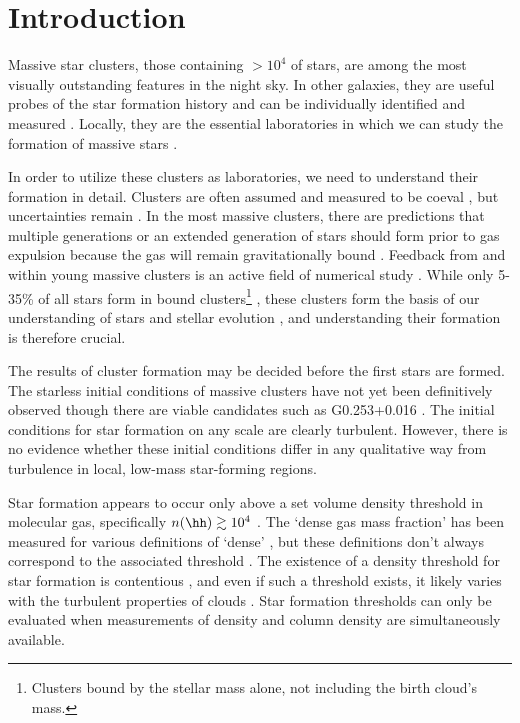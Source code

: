 \maketitle

\section{Introduction}

Massive star clusters, those containing $>10^4$ \msun of stars, are among the
most visually outstanding features in the night sky.  In other galaxies, they
are useful probes of the star formation history and can be individually
identified and measured \citep{Bastian2008a}.  Locally, they are the essential
laboratories in which we can study the formation of massive stars
\citep{Davies2012a}.

In order to utilize these clusters as laboratories, we need to understand their
formation in detail.  Clusters are often assumed and measured to be coeval
\citep[e.g.][]{Kudryavtseva2012a}, but uncertainties remain \citep{Beccari2010a}.
In the most massive clusters, there are predictions that multiple generations
or an extended generation of stars should form prior to gas expulsion because
the gas will remain gravitationally bound \citep{Bressert2012a}.   Feedback from
and within young massive clusters is an active field of numerical study
\citep{Rogers2013a,Dale2013a,Dale2012a,Dale2008a,Dale2005a,Parker2013a,Myers2014a,Krumholz2014a}.
While
only 5-35\% of all stars form in bound clusters\footnote{Clusters bound by the
stellar mass alone, not including the birth cloud's mass.}
\citep{Kruijssen2012a}, these clusters form the basis of our understanding of
stars and stellar evolution
\citep{Kalirai2010a}, and understanding their formation is therefore crucial.

The results of cluster formation may be decided before the first stars are
formed.  The starless initial conditions of massive clusters have not yet been
definitively observed \citep{Ginsburg2012a} though there are viable candidates
such as G0.253+0.016 \citep{Longmore2012b}.  The initial conditions for star
formation on any scale are clearly turbulent.  However, there is no evidence
whether these initial conditions differ in any qualitative way from turbulence
in local, low-mass star-forming regions.

Star formation appears to occur only above a set volume density threshold in
molecular gas, specifically $n(\hh)\gtrsim10^4$ \percc \citep[][who advocate a
column density threshold corresponding to this density]{Lada2010a}.  The `dense
gas mass fraction' has been measured for various definitions of `dense'
\citep{Battisti2014a,Wu2005a}, but these definitions don't always correspond to
the associated threshold
\citep{Kauffmann2010a,Parmentier2011a,Parmentier2011b}.  The existence of a
density threshold for star formation is contentious
\citep{Burkert2012a,Clark2013b}, and even if such a threshold exists, it likely
varies with the turbulent properties of clouds \citep{Longmore2013b}.  Star
formation thresholds can only be evaluated when measurements of density and
column density are simultaneously available.  

